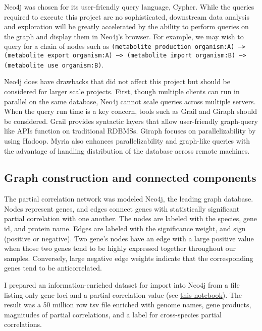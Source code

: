 \documentclass[12pt]{article}
\begin{document}
Neo4j was chosen for its user-friendly query language, Cypher. %
While the queries required to execute this project are no sophisticated, downstream data analysis and exploration will be greatly accelerated by the ability to perform queries on the graph and display them in Neo4j's browser. 
For example, we may wish to query for a chain of nodes such as \texttt{(metabolite production organism:A) --> (metabolite export organism:A) --> (metabolite import organism:B) --> (metabolite use organism:B)}.  

Neo4j does have drawbacks that did not affect this project but should be considered for larger scale projects.
First, though multiple clients can run in parallel on the same database, Neo4j cannot scale queries across multiple servers.  
When the query run time is a key concern, tools such as Grail and Giraph \cite{fan2015case} should be considered. 
Grail provides syntactic layers that allow user-friendly graph-query like APIs function on traditional RDBMSs.
Giraph focuses on parallelizability by using Hadoop. 
Myria also enhances parallelizability and graph-like queries with the advantage of handling distribution of the database across remote machines. 

\subsection{Graph construction and connected components}

The partial correlation network was modeled Neo4j, the leading graph database.
Nodes represent genes, and edges connect genes with statistically significant partial correlation with one another. 
The nodes are labeled with the species, gene id, and protein name.
Edges are labeled with the significance weight, and sign (positive or negative). 
Two gene's nodes have an edge with a large positive value when those two genes tend to be highly expressed together throughout our samples. 
Conversely, large negative edge weights indicate that the corresponding genes tend to be anticorrelated. 

I prepared an information-enriched dataset for import into Neo4j from a file listing only gene loci and a partial correlation value (see \href{https://github.com/JanetMatsen/Neo4j_meta4/blob/master/jupyter/prepare_whole_network.ipynb}{this notebook}).  
The result was a 50 million row tsv file enriched with genome names, gene products, magnitudes of partial correlations, and a label for cross-species partial correlations.
\end{document}
